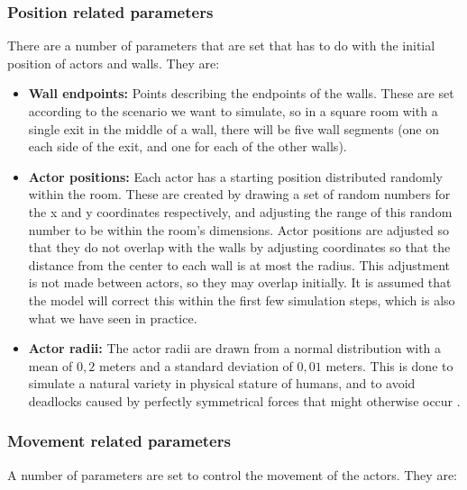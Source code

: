 \subsubsection{Position related parameters}
There are a number of parameters that are set that has to do with the initial 
position of actors and walls. They are:

\begin{itemize}
    \item \textbf{Wall endpoints:} Points describing the endpoints of the 
        walls. These are set according to the scenario we want to simulate, so 
        in a square room with a single exit in the middle of a wall, there 
        will be five wall segments (one on each side of the exit, and one for 
        each of the other walls).

    \item \textbf{Actor positions:} Each actor has a starting position 
        distributed randomly within the room. These are created by drawing a 
        set of random numbers for the x and y coordinates respectively, and 
        adjusting the range of this random number to be within the room's 
        dimensions. Actor positions are adjusted so that they do not overlap 
        with the walls by adjusting coordinates so that the distance from the 
        center to each wall is at most the radius. This adjustment is not made 
        between actors, so they may overlap initially. It is assumed that the 
        model will correct this within the first few simulation steps, which 
        is also what we have seen in practice.

    \item \textbf{Actor radii:} The actor radii are drawn from a normal 
        distribution with a mean of $0,2$ meters and a standard deviation of 
        $0,01$ meters. This is done to simulate a natural variety in physical 
        stature of humans, and to avoid deadlocks caused by perfectly 
        symmetrical forces that might otherwise occur \cite{helbing00}.
\end{itemize}

\subsubsection{Movement related parameters}
A number of parameters are set to control the movement of the actors. They 
are:

